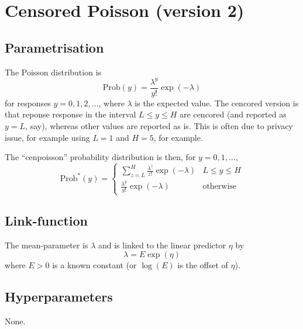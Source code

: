 \documentclass[a4paper,11pt]{article}
\begin{document}
\section*{Censored Poisson (version 2)}

\subsection*{Parametrisation}

The Poisson distribution is
\begin{displaymath}
    \text{Prob}(y) = \frac{\lambda^{y}}{y!}\exp(-\lambda)
\end{displaymath}
for responses $y=0, 1, 2, \ldots$, where $\lambda$ is the expected
value. The cencored version is that reponse response in the interval
$L \le y \le H$ are cencored (and reported as $y=L$, say), whereas
other values are reported as is. This is often due to privacy issue,
for example using $L=1$ and $H=5$, for example. 

The ``cenpoisson'' probability distribution is then, for 
$y=0, 1, \ldots, $
\begin{displaymath}
    \text{Prob}^{*}(y) =
    \begin{cases}
      \sum_{z=L}^{H}
      \frac{\lambda^{z}}{z!}\exp(-\lambda) & L
                                             \leq
                                             y
                                             \leq
                                             H \\
      \frac{\lambda^{y}}{y!}\exp(-\lambda) & \text{otherwise}
    \end{cases}
\end{displaymath}


\subsection*{Link-function}

The mean-parameter is $\lambda$ and is linked to the linear predictor $\eta$
by
\begin{displaymath}
    \lambda = E \exp(\eta)
\end{displaymath}
where $E>0$ is a known constant (or $\log(E)$ is the offset of $\eta$).

\subsection*{Hyperparameters}

None.
\end{document}
